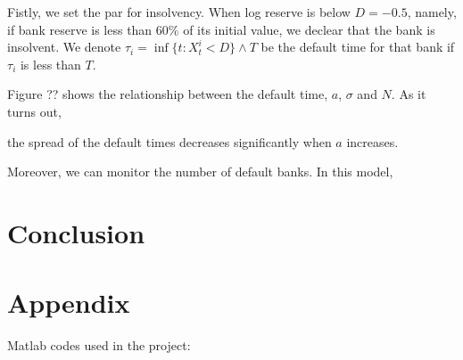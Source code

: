 \documentclass[a4paper, 11pt]{article}
\newcommand{\includecode}[1]{}
\begin{document}
Fistly, we set the par for insolvency. When log reserve is below $D = -0.5$, namely, if bank reserve is less than 60\% of its initial value, we declear that the bank is insolvent. We denote $\tau_i = \inf\{t:X_t^i<D\}\wedge T$ be the default time for that bank if $\tau_i$ is less than $T$. 

Figure ?? shows the relationship between the default time, $a$, $\sigma$ and $N$. As it turns out,

the spread of the default times decreases significantly when $a$ increases. 

Moreover, we can monitor the number of default banks. In this model, 



\section{Conclusion}



%
%

\section{Appendix}
Matlab codes used in the project:
\end{document}
